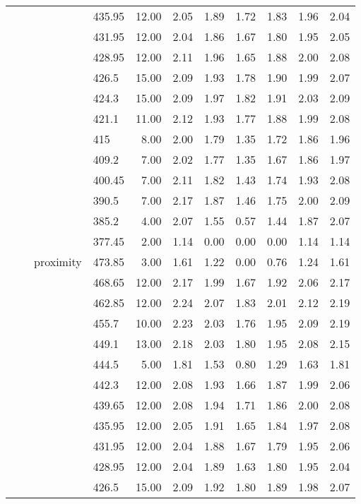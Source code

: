 \begin{longtable}{llllrrrrrrr}
   &  &  & 435.95 & 12.00 & 2.05 & 1.89 & 1.72 & 1.83 & 1.96 & 2.04 \\ 
   &  &  & 431.95 & 12.00 & 2.04 & 1.86 & 1.67 & 1.80 & 1.95 & 2.05 \\ 
   &  &  & 428.95 & 12.00 & 2.11 & 1.96 & 1.65 & 1.88 & 2.00 & 2.08 \\ 
   &  &  & 426.5 & 15.00 & 2.09 & 1.93 & 1.78 & 1.90 & 1.99 & 2.07 \\ 
   &  &  & 424.3 & 15.00 & 2.09 & 1.97 & 1.82 & 1.91 & 2.03 & 2.09 \\ 
   &  &  & 421.1 & 11.00 & 2.12 & 1.93 & 1.77 & 1.88 & 1.99 & 2.08 \\ 
   &  &  & 415 & 8.00 & 2.00 & 1.79 & 1.35 & 1.72 & 1.86 & 1.96 \\ 
   &  &  & 409.2 & 7.00 & 2.02 & 1.77 & 1.35 & 1.67 & 1.86 & 1.97 \\ 
   &  &  & 400.45 & 7.00 & 2.11 & 1.82 & 1.43 & 1.74 & 1.93 & 2.08 \\ 
   &  &  & 390.5 & 7.00 & 2.17 & 1.87 & 1.46 & 1.75 & 2.00 & 2.09 \\ 
   &  &  & 385.2 & 4.00 & 2.07 & 1.55 & 0.57 & 1.44 & 1.87 & 2.07 \\ 
   &  &  & 377.45 & 2.00 & 1.14 & 0.00 & 0.00 & 0.00 & 1.14 & 1.14 \\ 
   &  & proximity & 473.85 & 3.00 & 1.61 & 1.22 & 0.00 & 0.76 & 1.24 & 1.61 \\ 
   &  &  & 468.65 & 12.00 & 2.17 & 1.99 & 1.67 & 1.92 & 2.06 & 2.17 \\ 
   &  &  & 462.85 & 12.00 & 2.24 & 2.07 & 1.83 & 2.01 & 2.12 & 2.19 \\ 
   &  &  & 455.7 & 10.00 & 2.23 & 2.03 & 1.76 & 1.95 & 2.09 & 2.19 \\ 
   &  &  & 449.1 & 13.00 & 2.18 & 2.03 & 1.80 & 1.95 & 2.08 & 2.15 \\ 
   &  &  & 444.5 & 5.00 & 1.81 & 1.53 & 0.80 & 1.29 & 1.63 & 1.81 \\ 
   &  &  & 442.3 & 12.00 & 2.08 & 1.93 & 1.66 & 1.87 & 1.99 & 2.06 \\ 
   &  &  & 439.65 & 12.00 & 2.08 & 1.94 & 1.71 & 1.86 & 2.00 & 2.08 \\ 
   &  &  & 435.95 & 12.00 & 2.05 & 1.91 & 1.65 & 1.84 & 1.97 & 2.08 \\ 
   &  &  & 431.95 & 12.00 & 2.04 & 1.88 & 1.67 & 1.79 & 1.95 & 2.06 \\ 
   &  &  & 428.95 & 12.00 & 2.04 & 1.89 & 1.63 & 1.80 & 1.95 & 2.04 \\ 
   &  &  & 426.5 & 15.00 & 2.09 & 1.92 & 1.80 & 1.89 & 1.98 & 2.07 \\ 

\end{longtable}
